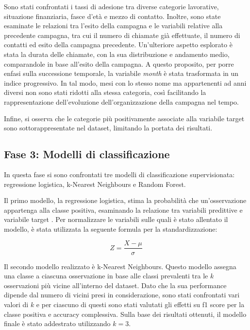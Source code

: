 \documentclass[11,5pt, a4paper]{article}
\begin{document}
Sono stati confrontati i tassi di adesione tra diverse categorie lavorative, situazione finanziaria, fasce d'età e mezzo di contatto. Inoltre, sono state esaminate le relazioni tra l'esito della campagna e le variabili relative alla precedente campagna, tra cui il numero di chiamate già effettuate, il numero di contatti ed esito della campagna precedente. Un'ulteriore aspetto esplorato è stata la durata delle chiamate, con la sua distribuzione e andamento medio, comparandole in base all'esito della campagna. 
A questo proposito, per porre enfasi sulla successione temporale, la variabile \textit{month} è stata trasformata in un indice progressivo. In tal modo, mesi con lo stesso nome ma appartenenti ad anni diversi non sono stati ridotti alla stessa categoria, così facilitando la rappresentazione dell'evoluzione dell'organizzazione della campagna nel tempo.

Infine, si osserva che le categorie più positivamente associate alla variabile target sono sottorappresentate nel dataset, limitando la portata dei risultati.

\subsection{Fase 3: Modelli di classificazione}
\label{ss: Fase 3}
In questa fase si sono confrontati tre modelli di classificazione supervisionata: regressione logistica, k-Nearest Neighbours e Random Forest.

Il primo modello, la regressione logistica, stima la probabilit\`{a} che un'osservazione appartenga alla classe positiva, esaminando la relazione tra variabili predittive e variabile target \citep{REGLOG_IBM}. Per normalizzare le variabili sulle quali \`{e} stato allentato il modello, \`{e} stata utilizzata la seguente formula per la standardizzazione:

\begin{equation*}
    Z = \frac{X-\mu}{\sigma}
\end{equation*}

Il secondo modello realizzato è k-Nearest Neighbours. Questo modello assegna una classe a ciascuna osservazione in base alle classi prevalenti tra le $k$ osservazioni più vicine all'interno del dataset. Dato che la sua performance dipende dal numero di vicini presi in considerazione, sono stati confrontati vari valori di $k$ e per ciascuno di questi sono stati valutati gli effetti su f1 score per la classe positiva e accuracy complessiva. Sulla base dei risultati ottenuti, il modello finale è stato addestrato utilizzando $k=3$.
\end{document}
